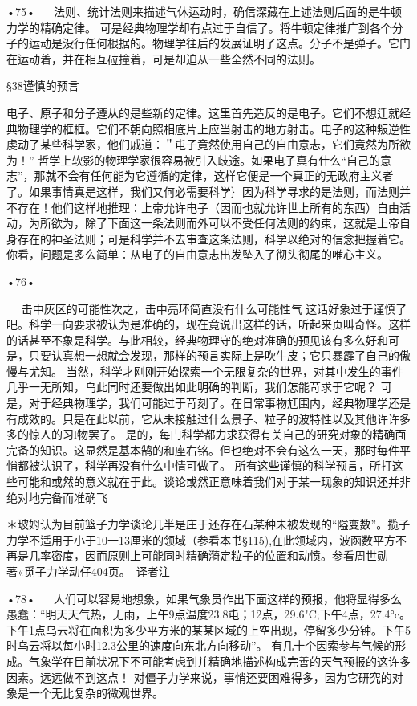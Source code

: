 •75•
  
法则、统计法则来描述气休运动时，确信深藏在上述法则后面的是牛顿力学的精确定律。
可是经典物理学却有点过于自信了。将牛顿定律推广到各个分子的运动是没行任何根据的。物理学往后的发展证明了这点。分子不是弹子。它门在运动着，并在相互砬撞着，可是却迫从一些全然不同的法则。

§38谨慎的预言

电子、原子和分子遵从的是些新的定律。这里首先造反的是电子。它们不想迁就经典物理学的框框。它们不朝向照相底片上应当射击的地方射击。电子的这种叛逆性虔动了某些科学家，他们戚道：＂屯子竟然使用自己的自由意忐，它们竟然为所欲为！”
哲学上软影的物理学家很容易被引入歧途。如果电子真有什么“自己的意志”，那就不会有任何能为它遵循的定律，这样它便是一个真正的无政府主义者了。如果事情真是这样，我们又何必需要科学｝因为科学寻求的是法则，而法则并不存在！他们这样地推理：上帝允许电子（因而也就允许世上所有的东西）自由活动，为所欲为，除了下面这一条法则而外可以不受任何法则的约束，这就是上帝自身存在的神圣法则；可是科学并不去审查这条法则，科学以绝对的信念把握着它。你看，问题是多么简单：从电子的自由意志出发坠入了彻头彻尾的唯心主义。

•76•
  



  
击中灰区的可能性次之，击中亮环简直没有什么可能性气
这话好象过于谨慎了吧。科学一向要求被认为是准确的，现在竟说出这样的话，听起来页叫奇怪。这样的话甚至不象是科学。与此相较，经典物理守的绝对准确的预见该有多么好和可是，只要认真想一想就会发现，那样的预言实际上是吹牛皮；它只暴霹了自己的傲慢与尤知。
当然，科学才刚刚开始探索一个无限复杂的世界，对其中发生的事件几乎一无所知，乌此同时还要做出如此明确的判断，我们怎能苛求于它呢？
可是，对于经典物理学，我们可能过于苛刻了。在日常事物尪围内，经典物理学还是有成效的。只是在此以前，它从未接触过什么景子、粒子的波特性以及其他许许多多的惊人的习l物罢了。
是的，每门科学都力求获得有关自己的研究对象的精确面完备的知识。这显然是基本鹄的和座右铭。但也绝对不会有这么一天，那时每件平悄都被认识了，科学再没有什么中情可做了。
所有这些谨慎的科学预言，所打这些可能和或然的意义就在于此。谈论或然正意味着我们对于某一现象的知识还并非绝对地完备而准确飞

＊玻姆认为目前篮子力学谈论几半是庄于还存在石某种未被发现的“隘变数”。揽子力学不适用于小于10一13厘米的领域（参看本书§115),在此领域内，波函数平方不再是几率密度，因而原则上可能同时精确漪定粒子的位置和动愤。参看周世勋著«觅子力学动仔404页。--译者注

•78•
  
人们可以容易地想象，如果气象员作出下面这样的预报，他将显得多么愚蠢：“明天天气热，无雨，上午9点温度23.8屯；12点，29.6"C;下午4点，27.4°c。下午1点乌云将在面积为多少平方米的某某区域的上空出现，停留多少分钟。下午5时乌云将以每小时12.3公里的速度向东北方向移动”。
有几十个因索参与气候的形成。气象学在目前状况下不可能考虑到并精确地描述构成完善的天气预报的这许多因素。远远做不到这点！
对僵子力学来说，事悄还要困难得多，因为它研究的对象是一个无比复杂的微观世界。

